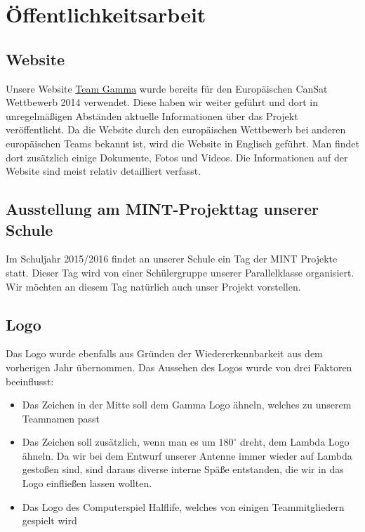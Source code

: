 \section{Öffentlichkeitsarbeit}
\subsection{Website}
Unsere Website \href{www.team-gamma.de}{Team Gamma} wurde bereits für den Europäischen CanSat Wettbewerb 2014 verwendet. Diese haben wir weiter geführt und dort in unregelmäßigen Abständen aktuelle Informationen über das Projekt veröffentlicht. Da die Website durch den europäischen Wettbewerb bei anderen europäischen Teams bekannt ist, wird die Website in Englisch geführt. Man findet dort zusätzlich einige Dokumente, Fotos und Videos. Die Informationen auf der Website sind meist relativ detailliert verfasst. 

\subsection{Ausstellung am MINT-Projekttag unserer Schule}
Im Schuljahr 2015/2016 findet an unserer Schule ein Tag der MINT Projekte statt. Dieser Tag wird von einer Schülergruppe unserer Parallelklasse organisiert. Wir möchten an diesem Tag natürlich auch unser Projekt vorstellen.

\subsection{Logo}
Das Logo wurde ebenfalls aus Gründen der Wiedererkennbarkeit aus dem vorherigen Jahr übernommen. Das Aussehen des Logos wurde von drei Faktoren beeinflusst:
\begin{itemize}
	\item Das Zeichen in der Mitte soll dem Gamma Logo ähneln, welches zu unserem Teamnamen passt
	\item Das Zeichen soll zusätzlich, wenn man es um $180^\circ$ dreht, dem Lambda Logo ähneln. Da wir bei dem Entwurf unserer Antenne immer wieder auf Lambda gestoßen sind, sind daraus diverse interne Späße entstanden, die wir in das Logo einfließen lassen wollten.
	\item Das Logo des Computerspiel Halflife, welches von einigen Teammitgliedern gespielt wird
\end{itemize}